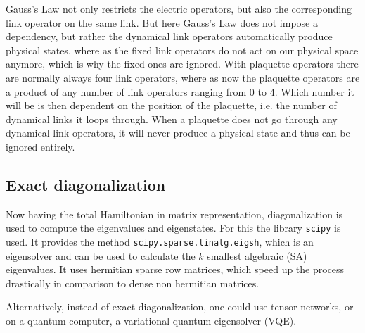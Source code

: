 Gauss's Law not only restricts the electric operators, but also the corresponding link operator on the same link. But here Gauss's Law does not impose a dependency, but rather the dynamical link operators automatically produce physical states, where as the fixed link operators do not act on our physical space anymore, which is why the fixed ones are ignored. With plaquette operators there are normally always four link operators, where as now the plaquette operators are a product of any number of link operators ranging from 0 to 4. Which number it will be is then dependent on the position of the plaquette, i.e. the number of dynamical links it loops through. When a plaquette does not go through any dynamical link operators, it will never produce a physical state and thus can be ignored entirely.

\subsection{Exact diagonalization}
Now having the total Hamiltonian in matrix representation, diagonalization is used to compute the eigenvalues and eigenstates. For this the library \texttt{scipy} \cite{2020SciPy-NMeth} is used. It provides the method \texttt{scipy.sparse.linalg.eigsh}, which is an eigensolver and can be used to calculate the $k$ smallest algebraic (SA) eigenvalues. It uses hermitian sparse row matrices, which speed up the process drastically in comparison to dense non hermitian matrices.

Alternatively, instead of exact diagonalization, one could use tensor networks, or on a quantum computer, a variational quantum eigensolver (VQE).

